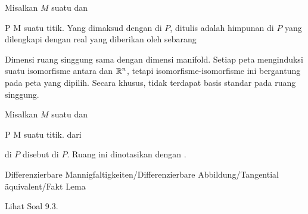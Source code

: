 {}
{

Misalkan $M$ suatu
dan

\mavergleichskette
{\vergleichskette
{ P
}
{ \in }{ M
}
{  }{
}
{    }{
}
{   }{
}
}
{}{}{}
suatu titik. Yang dimaksud dengan  di $P$, ditulis
 adalah himpunan
di $P$ yang dilengkapi dengan
real yang diberikan oleh sebarang

}

Dimensi ruang singgung sama dengan dimensi manifold. Setiap peta menginduksi suatu isomorfisme antara
 dan ${\mathbb R}^n$, tetapi isomorfisme-isomorfisme ini bergantung pada peta yang dipilih. Secara khusus, tidak terdapat basis standar pada ruang singgung.

{}
{

Misalkan $M$ suatu
dan

\mavergleichskette
{\vergleichskette
{ P
}
{ \in }{ M
}
{  }{
}
{    }{
}
{   }{
}
}
{}{}{}
suatu titik. 
dari

 di $P$ disebut  di $P$. Ruang ini dinotasikan dengan
 {  }
.

}


{Differenzierbare Mannigfaltigkeiten/Differenzierbare Abbildung/Tangential äquivalent/Fakt}
{Lema}
{}
{

\faktzusatz {}
\faktzusatz {}

 }
{ Lihat Soal 9.3. }

